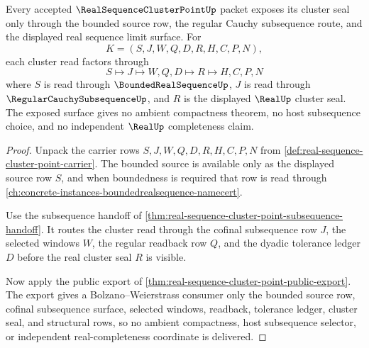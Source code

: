 \begin{theorem}\label{thm:real-sequence-cluster-point-window-localization}
Every accepted $\RealSequenceClusterPointUp$ packet exposes its cluster seal only through the bounded source row, the regular Cauchy subsequence route, and the displayed real sequence limit surface. For
$$
K=(S,J,W,Q,D,R,H,C,P,N),
$$
each cluster read factors through
$$
S \longmapsto J \longmapsto W,Q,D \longmapsto R \longmapsto H,C,P,N
$$
where $S$ is read through $\BoundedRealSequenceUp$, $J$ is read through $\RegularCauchySubsequenceUp$, and $R$ is the displayed $\RealUp$ cluster seal. The exposed surface gives no ambient compactness theorem, no host subsequence choice, and no independent $\RealUp$ completeness claim.
\end{theorem}
\begin{proof}
Unpack the carrier rows $S,J,W,Q,D,R,H,C,P,N$ from \autoref{def:real-sequence-cluster-point-carrier}. The bounded source is available only as the displayed source row $S$, and when boundedness is required that row is read through \autoref{ch:concrete-instances-boundedrealsequence-namecert}.

Use the subsequence handoff of \autoref{thm:real-sequence-cluster-point-subsequence-handoff}. It routes the cluster read through the cofinal subsequence row $J$, the selected windows $W$, the regular readback row $Q$, and the dyadic tolerance ledger $D$ before the real cluster seal $R$ is visible.

Now apply the public export of \autoref{thm:real-sequence-cluster-point-public-export}. The export gives a Bolzano--Weierstrass consumer only the bounded source row, cofinal subsequence surface, selected windows, readback, tolerance ledger, cluster seal, and structural rows, so no ambient compactness, host subsequence selector, or independent real-completeness coordinate is delivered.
\end{proof}



